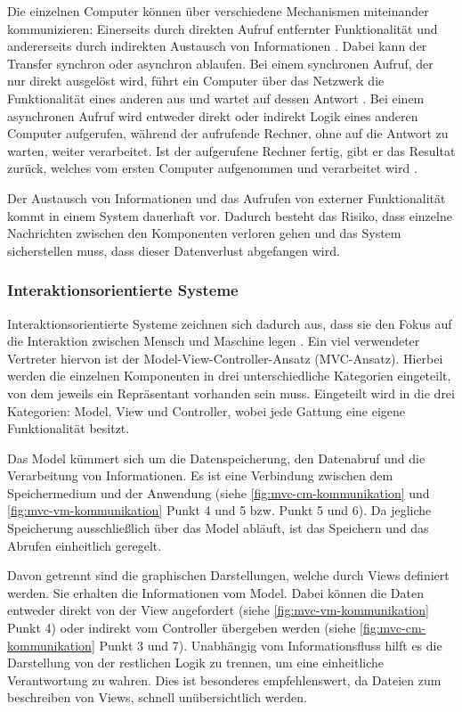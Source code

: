 Die einzelnen Computer können über verschiedene Mechanismen miteinander kommunizieren: Einerseits durch direkten Aufruf entfernter Funktionalität und andererseits durch indirekten Austausch von Informationen \parencite[vgl.][S. 116]{starke_effektive_2015}. Dabei kann der Transfer synchron oder asynchron ablaufen. Bei einem synchronen Aufruf, der nur direkt ausgelöst wird, führt ein Computer über das Netzwerk die Funktionalität eines anderen aus und wartet auf dessen Antwort \parencite{synchrone_2018}.
Bei einem asynchronen Aufruf wird entweder direkt oder indirekt Logik eines anderen Computer aufgerufen, während der aufrufende Rechner, ohne auf die Antwort zu warten, weiter verarbeitet. Ist der aufgerufene Rechner fertig, gibt er das Resultat zurück, welches vom ersten Computer aufgenommen und verarbeitet wird \parencite{wiki_asynchrone_2019}.

Der Austausch von Informationen und das Aufrufen von externer Funktionalität kommt in einem System dauerhaft vor. Dadurch besteht das Risiko, dass einzelne Nachrichten zwischen den Komponenten verloren gehen und das System sicherstellen muss, dass dieser Datenverlust abgefangen wird.

\subsubsection{Interaktionsorientierte Systeme}
\label{sec:mvc}

Interaktionsorientierte Systeme zeichnen sich dadurch aus, dass sie den Fokus auf die Interaktion zwischen Mensch und Maschine legen \parencite[vgl.][S. 124]{starke_effektive_2015}.
Ein viel verwendeter Vertreter hiervon ist der Model-View-Controller-Ansatz (MVC-Ansatz). Hierbei werden die einzelnen Komponenten in drei unterschiedliche Kategorien eingeteilt, von dem jeweils ein Repräsentant vorhanden sein muss. Eingeteilt wird in die drei Kategorien: Model, View und Controller, wobei jede Gattung eine eigene Funktionalität besitzt.

Das Model kümmert sich um die Datenspeicherung, den Datenabruf und die Verarbeitung von Informationen. Es ist eine Verbindung zwischen dem Speichermedium und der Anwendung (siehe \cref{fig:mvc-cm-kommunikation} und \cref{fig:mvc-vm-kommunikation} Punkt 4 und 5 bzw. Punkt 5 und 6). Da jegliche Speicherung ausschließlich über das Model abläuft, ist das Speichern und das Abrufen einheitlich geregelt.

Davon getrennt sind die graphischen Darstellungen, welche durch Views definiert werden. Sie erhalten die Informationen vom Model. Dabei können die Daten entweder direkt von der View angefordert (siehe \cref{fig:mvc-vm-kommunikation} Punkt 4) oder indirekt vom Controller übergeben werden (siehe \cref{fig:mvc-cm-kommunikation} Punkt 3 und 7). Unabhängig vom Informationsfluss hilft es die Darstellung von der restlichen Logik zu trennen, um eine einheitliche Verantwortung zu wahren. Dies ist besonderes empfehlenswert, da Dateien zum beschreiben von Views, schnell unübersichtlich werden.

